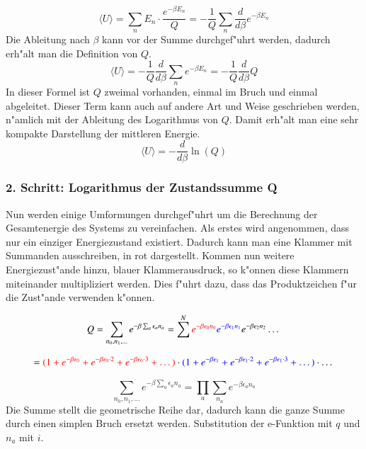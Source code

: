\begin{refsection}
\begin{equation*}
\langle U \rangle = \sum_{n} E_n \cdot \frac{e^{-\beta E_n}}{Q} = -\frac{1}{Q} \sum_{n} \frac{d}{d \beta} e^{-\beta E_n} 
\end{equation*}
Die Ableitung nach $\beta$ kann vor der Summe durchgef"uhrt werden, dadurch erh"alt man die Definition von $Q$.
\begin{equation*}
\langle U \rangle = -\frac{1}{Q} \frac{d}{d \beta} \sum_{n}  e^{-\beta E_n}  = -\frac{1}{Q} \frac{d}{d \beta}Q
\end{equation*}
In dieser Formel ist $Q$ zweimal vorhanden, einmal im Bruch und einmal abgeleitet. Dieser Term kann auch auf andere Art und Weise geschrieben werden, n"amlich mit der Ableitung des Logarithmus von $Q$. Damit erh"alt man eine sehr kompakte Darstellung der mittleren Energie.
\begin{equation}
\langle U \rangle = -\frac{d}{d \beta} \ln(Q)
\end{equation}

\subsubsection{2. Schritt: Logarithmus der Zustandssumme Q}

Nun werden einige Umformungen durchgef"uhrt um die Berechnung der Gesamtenergie des Systems zu vereinfachen.
Als erstes wird angenommen, dass nur ein einziger Energiezustand existiert.
Dadurch kann man eine Klammer mit Summanden ausschreiben, in rot dargestellt.
Kommen nun weitere Energiezust"ande hinzu, blauer Klammerausdruck, so k"onnen diese Klammern miteinander multipliziert werden.
Dies f"uhrt dazu, dass das Produktzeichen f"ur die Zust"ande verwenden k"onnen.


\begin{equation}
Q = \sum\limits_{n_0, n_1, \dots} e^{- \beta \sum_a \epsilon_a n_a } 
=  \sum^N  \textcolor{red}{ e^{- \beta \epsilon_0 n_0 }} \textcolor{blue} {e^{- \beta \epsilon_1 n_1 }} e^{- \beta \epsilon_2 n_2 } \dots 
\end{equation}

\begin{equation*}
= \textcolor{red} {(1+e^{- \beta \epsilon_0 }+e^{- \beta \epsilon_0 \cdot 2  }+e^{- \beta \epsilon_0 \cdot 3  }+ \dots)} \cdot \textcolor{blue} {(1+e^{- \beta \epsilon_1 }+e^{- \beta \epsilon_1 \cdot 2  }+e^{- \beta \epsilon_1 \cdot 3  }+ \dots)} \cdot \dots
\end{equation*}

\begin{equation}
\sum\limits_{n_0, n_1, \dots} e^{- \beta \sum_a \epsilon_a n_a } = \prod_{a} \sum_{n_a} e^{- \beta \epsilon_a n_a }
\end{equation}
Die Summe stellt die geometrische Reihe dar, dadurch kann die ganze Summe durch einen simplen Bruch ersetzt werden. Substitution der e-Funktion mit $q$ und $n_a$ mit $i$.


\end{refsection}
